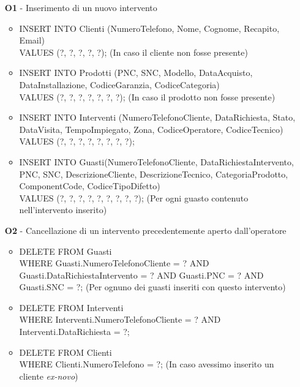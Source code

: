 \documentclass[a4paper, 12pt]{report}
\begin{document}
\begin{itemize}
	\item[\textbf{O1} -] Inserimento di un nuovo intervento
		\begin{itemize}[leftmargin=*, topsep=0pt]
			\item INSERT INTO Clienti (NumeroTelefono, Nome, Cognome, Recapito, Email) \\VALUES (?, ?, ?, ?, ?);
				\subitem (In caso il cliente non fosse presente)\newline
			\item INSERT INTO Prodotti (PNC, SNC, Modello, DataAcquisto, DataInstallazione, CodiceGaranzia, CodiceCategoria) \\VALUES (?, ?, ?, ?, ?, ?, ?);
				\subitem (In caso il prodotto non fosse presente)\newline
			\item INSERT INTO Interventi (NumeroTelefonoCliente, DataRichiesta, Stato, DataVisita, TempoImpiegato, Zona, CodiceOperatore, CodiceTecnico) \\VALUES (?, ?, ?, ?, ?, ?, ?, ?);\newline			
			\item INSERT INTO Guasti(NumeroTelefonoCliente, DataRichiestaIntervento, PNC, SNC, DescrizioneCliente, DescrizioneTecnico, CategoriaProdotto, ComponentCode, CodiceTipoDifetto) \\VALUES (?, ?, ?, ?, ?, ?, ?, ?, ?);
				\subitem (Per ogni guasto contenuto nell'intervento inserito)
		\end{itemize}
	\item[\textbf{O2} -] Cancellazione di un intervento precedentemente aperto dall'operatore
		\begin{itemize}[leftmargin=*, topsep=0pt]
			\item DELETE FROM Guasti \\WHERE Guasti.NumeroTelefonoCliente = ? AND Guasti.DataRichiestaIntervento = ? AND Guasti.PNC = ? AND Guasti.SNC = ?;
				\subitem (Per ognuno dei guasti inseriti con questo intervento)\newline
			\item DELETE FROM Interventi \\WHERE Interventi.NumeroTelefonoCliente = ? AND Interventi.DataRichiesta = ?;\newline
			\item DELETE FROM Clienti \\WHERE Clienti.NumeroTelefono = ?;
				\subitem (In caso avessimo inserito un cliente \textit{ex-novo})\newline

\end{itemize}
\end{itemize}
\end{document}
